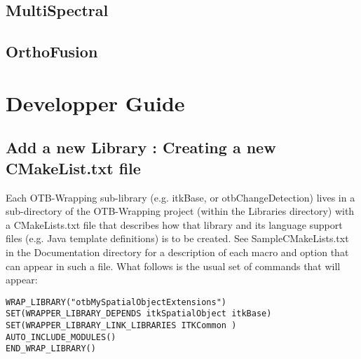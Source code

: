 \subsection{MultiSpectral}


\subsection{OrthoFusion}




\section{Developper Guide}\label{sec:dev}

\subsection{Add a new Library : Creating a new CMakeList.txt file}
Each OTB-Wrapping sub-library (e.g. itkBase, or otbChangeDetection) 
lives in a sub-directory of the OTB-Wrapping project (within the Libraries directory)
 with a CMakeLists.txt file that describes how that library and its language support files 
(e.g. Java template definitions) is to be created. 
See SampleCMakeLists.txt in the Documentation directory for a description of each macro and option that
can appear in such a file. What follows is the usual set of commands that will appear:

\small
\verb$WRAP_LIBRARY("otbMySpatialObjectExtensions")$ \\
\verb$SET(WRAPPER_LIBRARY_DEPENDS itkSpatialObject itkBase)$ \\
\verb$SET(WRAPPER_LIBRARY_LINK_LIBRARIES ITKCommon )$ \\
\verb$AUTO_INCLUDE_MODULES()$ \\
\verb$END_WRAP_LIBRARY()$ \\
\normalsize


